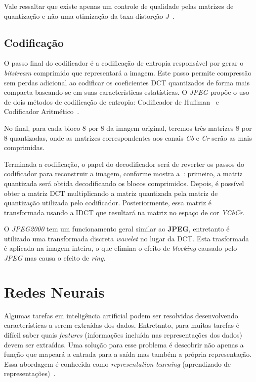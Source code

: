Vale ressaltar que existe apenas um controle de qualidade pelas matrizes de quantização e não uma otimização da taxa-distorção $J$~.
\subsection{Codificação}
O passo final do codificador é a codificação de entropia responsável por gerar o \textit{bitstream} comprimido que representará a imagem. Este passo permite compressão sem perdas adicional ao codificar os coeficientes \acrshort{DCT} quantizados de forma mais compacta baseando-se em suas características estatísticas. O \textit{JPEG} propõe o uso de dois métodos de codificação de entropia: Codificador de Huffman~\cite{huffman1952method} e Codificador Aritmético~\cite{pennebaker1988arithmetic}. 

No final, para cada bloco 8 por 8 da imagem original, teremos três matrizes 8 por 8 quantizadas, onde as matrizes correspondentes aos canais \textit{Cb} e \textit{Cr} serão as mais comprimidas.

Terminada a codificação, o papel do decodificador será de reverter os passos do codificador para reconstruir a imagem, conforme mostra a~: primeiro, a matriz quantizada será obtida decodificando os blocos comprimidos. Depois, é possível obter a matriz \acrshort{DCT} multiplicando a matriz quantizada pela matriz de quantização utilizada pelo codificador. Posteriormente, essa matriz é transformada usando a \acrshort{IDCT} que resultará na matriz no espaço de cor \textit{YCbCr}.

O \textit{JPEG2000} tem um funcionamento geral similar ao \textbf{JPEG}, entretanto é utilizado uma transformada discreta \textit{wavelet} no lugar da \acrshort{DCT}. Esta trasformada é aplicada na imagem inteira, o que elimina o efeito de \textit{blocking} causado pelo \textit{JPEG} mas causa o efeito de \textit{ring}.
\section{Redes Neurais}
Algumas tarefas em inteligência artificial podem ser resolvidas desenvolvendo características a serem extraídas dos dados. Entretanto, para muitas tarefas é difícil saber quais \textit{features} (informações incluída nas representações dos dados) devem ser extraídas. Uma solução para esse problema é descobrir não apenas a função que mapeará a entrada para a saída mas também a própria representação. Essa abordagem é conhecida como \textit{representation learning} (aprendizado de representações)~\cite{deeplearning}.

